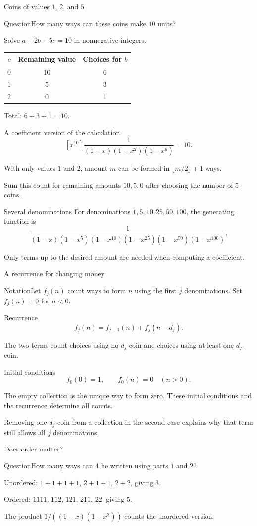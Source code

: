 \documentclass[aspectratio=169,11pt]{beamer}
\newcommand{\Def}[2]{\begin{block}{#1}#2\end{block}}
\newcommand{\Thm}[2]{\begin{block}{#1}#2\end{block}}
\newcommand{\Question}[1]{\begin{block}{Question}#1\end{block}}
\newcommand{\gap}{\par\medskip}
\begin{document}
\begin{frame}{Coins of values $1$, $2$, and $5$}
\large
\Question{How many ways can these coins make $10$ units?}
\gap Solve $a+2b+5c=10$ in nonnegative integers.
\begin{center}\begin{tabular}{c|c|c}
$c$ & Remaining value & Choices for $b$\\\hline
0&10&6\\1&5&3\\2&0&1
\end{tabular}\end{center}
\gap Total: $6+3+1=10$.
\end{frame}
\begin{frame}{A coefficient version of the calculation}
\large
\[[x^{10}]\frac1{(1-x)(1-x^2)(1-x^5)}=10.\]
\gap With only values $1$ and $2$, amount $m$ can be formed in $\lfloor m/2\rfloor+1$ ways.
\gap Sum this count for remaining amounts $10,5,0$ after choosing the number of $5$-coins.
\end{frame}
\begin{frame}{Several denominations}
\large
For denominations $1,5,10,25,50,100$, the generating function is
\[\frac1{(1-x)(1-x^5)(1-x^{10})(1-x^{25})(1-x^{50})(1-x^{100})}.\]
\gap Only terms up to the desired amount are needed when computing a coefficient.
\end{frame}
\begin{frame}{A recurrence for changing money}
\large
\Def{Notation}{Let $f_j(n)$ count ways to form $n$ using the first $j$ denominations. Set $f_j(n)=0$ for $n<0$.}
\Thm{Recurrence}{\[f_j(n)=f_{j-1}(n)+f_j(n-d_j).\]}
\gap The two terms count choices using no $d_j$-coin and choices using at least one $d_j$-coin.
\end{frame}
\begin{frame}{Initial conditions}
\large
\[f_0(0)=1,\qquad f_0(n)=0\quad(n>0).\]
\gap The empty collection is the unique way to form zero. These initial conditions and the recurrence determine all counts.
\gap Removing one $d_j$-coin from a collection in the second case explains why that term still allows all $j$ denominations.
\end{frame}
\begin{frame}{Does order matter?}
\large
\Question{How many ways can $4$ be written using parts $1$ and $2$?}
\gap Unordered: $1+1+1+1$, $2+1+1$, $2+2$, giving $3$.
\gap Ordered: $1111$, $112$, $121$, $211$, $22$, giving $5$.
\gap The product $1/((1-x)(1-x^2))$ counts the unordered version.
\end{frame}
\end{document}

